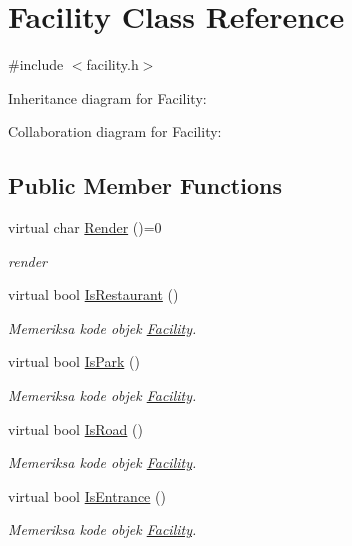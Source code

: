 \hypertarget{classFacility}{}\section{Facility Class Reference}
\label{classFacility}


{\ttfamily \#include $<$facility.\+h$>$}



Inheritance diagram for Facility\+:


Collaboration diagram for Facility\+:
\subsection*{Public Member Functions}
\begin{DoxyCompactItemize}
\item 
virtual char \hyperlink{classFacility_a177b3f9cd142fe4521c1d15b00d3675c}{Render} ()=0
\begin{DoxyCompactList}\small\item\em render \end{DoxyCompactList}\item 
virtual bool \hyperlink{classFacility_a2fb6a0e98e709b46b21e35cb8aeeeda7}{Is\+Restaurant} ()
\begin{DoxyCompactList}\small\item\em Memeriksa kode objek \hyperlink{classFacility}{Facility}. \end{DoxyCompactList}\item 
virtual bool \hyperlink{classFacility_acd5c991c33b331d67bb559f962d3bbc0}{Is\+Park} ()
\begin{DoxyCompactList}\small\item\em Memeriksa kode objek \hyperlink{classFacility}{Facility}. \end{DoxyCompactList}\item 
virtual bool \hyperlink{classFacility_ae2975cf479c3907e13fc200464b7443b}{Is\+Road} ()
\begin{DoxyCompactList}\small\item\em Memeriksa kode objek \hyperlink{classFacility}{Facility}. \end{DoxyCompactList}\item 
virtual bool \hyperlink{classFacility_a256cb0f3621b6545ec212d56672d5b3e}{Is\+Entrance} ()
\begin{DoxyCompactList}\small\item\em Memeriksa kode objek \hyperlink{classFacility}{Facility}. \end{DoxyCompactList}\item 

\end{DoxyCompactItemize}
